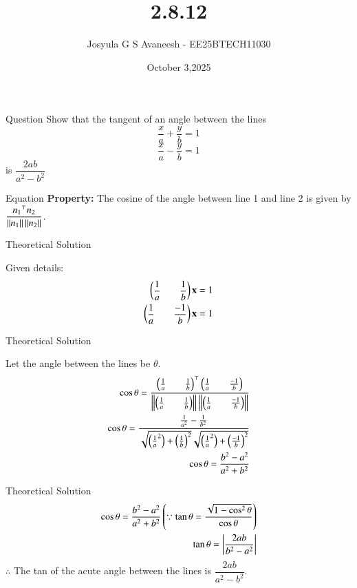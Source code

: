 \documentclass{beamer}
\title %
{2.8.12}
\date{October 3,2025}
\author 
{Josyula G S Avaneesh - EE25BTECH11030}
\begin{document}
\frame{\titlepage}
\begin{frame}{Question}
Show that the tangent of an angle between the lines
$$\frac{x}{a}+\frac{y}{b}=1$$
$$\frac{x}{a}-\frac{y}{b}=1$$
is $\dfrac{2ab}{a^2-b^2}$
\end{frame}



\begin{frame}{Equation}
\textbf{Property:} The cosine of the angle between line 1 and line 2 is given by $\dfrac{{n_1}^\top n_2}{\left\lVert n_1\right\rVert\left\lVert n_2\right\rVert} $.
\end{frame}
\begin{frame}{Theoretical Solution}

Given details:
\begin{align}
   \begin{pmatrix}\dfrac{1}{a}&&\dfrac{1}{b}\end{pmatrix}\mathbf{x}=1\\
   \begin{pmatrix}\dfrac{1}{a}&&\dfrac{-1}{b}\end{pmatrix}\mathbf{x}=1
\end{align}
\end{frame}

\begin{frame}{Theoretical Solution}

Let the angle between the lines be $\theta$.
\begin{align}
  \cos\theta=\dfrac{{\begin{pmatrix}\frac{1}{a}&&\frac{1}{b}\end{pmatrix}}^\top \begin{pmatrix}\frac{1}{a} && \frac{-1}{b}\end{pmatrix}}{{\left\lVert\begin{pmatrix}\frac{1}{a}&&\frac{1}{b}\end{pmatrix}\right\rVert}\left\lVert\begin{pmatrix}\frac{1}{a}&&\frac{-1}{b}\end{pmatrix}\right\rVert}\\
   \cos\theta=\frac{\frac{1}{a^2}-\frac{1}{b^2}}{\sqrt{\left({\frac{1}{a}}^2\right)+\left(\frac{1}{b}\right)^2}\sqrt{\left({\frac{1}{a}}^2\right)+\left(\frac{-1}{b}\right)^2}}\\
   \cos\theta=\frac{b^2-a^2}{a^2+b^2}
\end{align}
\end{frame}


\begin{frame}{Theoretical Solution} 
\begin{align}
   \cos\theta=\frac{b^2-a^2}{a^2+b^2}
   \left(\because \tan\theta=\frac{\sqrt{1-\cos^2\theta}}{\cos\theta}\right)\\
   \tan\theta=\left|\frac{2ab}{b^2-a^2}\right|
\end{align}
$\therefore$ The tan of the acute angle between the lines is $\dfrac{2ab}{a^2-b^2}$.

\end{frame}
\end{document}
